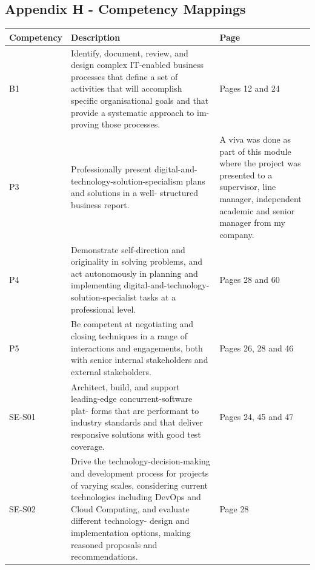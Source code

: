   \newpage
  \subsection{Appendix H - Competency Mappings}
    \begin{longtable}{|p{2cm}|p{8cm}|p{4cm}|}
      \hline
      \textbf{Competency} & \textbf{Description} & \textbf{Page} \\ \hline
      B1                  & Identify, document, review, and design complex IT-enabled business
                            processes that define a set of activities that will accomplish specific
                            organisational goals and that provide a systematic approach to im-
                            proving those processes. & Pages 12 and 24 \\ \hline

      P3                  & Professionally present digital-and-technology-solution-specialism plans
                            and solutions in a well- structured business report. 
                            
                          & A viva was done as part of this module where the project was presented to a supervisor, line manager, independent
                          academic and senior manager from my company. \\ \hline

      P4                  & Demonstrate self-direction and originality in solving problems, and
                            act autonomously in planning and implementing digital-and-technology-
                            solution-specialist tasks at a professional level. & Pages 28 and 60 \\ \hline

      P5                  & Be competent at negotiating and closing techniques in a range of
                            interactions and engagements, both with senior internal stakeholders
                            and external stakeholders. & Pages 26, 28 and 46 \\ \hline

      SE-S01              & Architect, build, and support leading-edge concurrent-software plat-
                            forms that are performant to industry standards and that deliver
                            responsive solutions with good test coverage. & Pages 24, 45 and 47 \\ \hline

      SE-S02              & Drive the technology-decision-making and development process for
                            projects of varying scales, considering current technologies including
                            DevOps and Cloud Computing, and evaluate different technology-
                            design and implementation options, making reasoned proposals and
                            recommendations. & Page 28 \\ \hline


\end{longtable}
